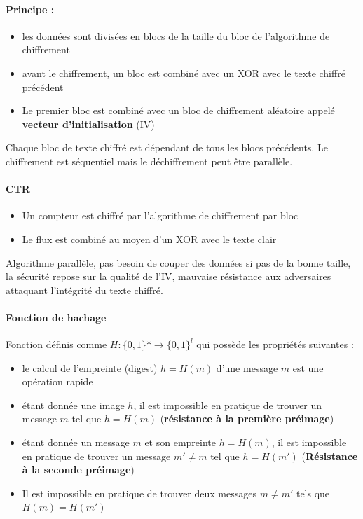\documentclass[11pt,a4paper]{report}
\begin{document}
\paragraph*{Principe : }
\begin{itemize}
    \item les données sont divisées en blocs de la taille du bloc de l'algorithme de chiffrement
    \item avant le chiffrement, un bloc est combiné avec un XOR avec le texte chiffré précédent
    \item Le premier bloc est combiné avec un bloc de chiffrement aléatoire appelé \textbf{vecteur d'initialisation} (IV)
\end{itemize}

Chaque bloc de texte chiffré est dépendant de tous les blocs précédents. Le chiffrement est séquentiel mais le déchiffrement peut être parallèle.

\paragraph*{CTR}

\begin{itemize}
    \item Un compteur est chiffré par l'algorithme de chiffrement par bloc
    \item Le flux est combiné au moyen d'un XOR avec le texte clair
\end{itemize}

Algorithme parallèle, pas besoin de couper des données si pas de la bonne taille, la sécurité repose sur la qualité de l'IV, mauvaise résistance aux adversaires attaquant l'intégrité du texte chiffré.

\paragraph*{Fonction de hachage}

Fonction définis comme $H:\{0,1\}* \rightarrow \{0,1\}^l$ qui possède les propriétés suivantes :
\begin{itemize}
    \item le calcul de l'empreinte (digest) $h = H(m)$ d'une message $m$ est une opération rapide
    \item étant donnée une image $h$, il est impossible en pratique de trouver un message $m$ tel que $h=H(m)$ (\textbf{résistance à la première préimage})
    \item étant donnée un message $m$ et son empreinte $h=H(m)$, il est impossible en pratique de trouver un message $m'\neq m$ tel que $h=H(m')$ (\textbf{Résistance à la seconde préimage})
    \item Il est impossible en pratique de trouver deux messages $m \neq m'$ tels que $H(m) = H(m')$
\end{itemize}
\end{document}
